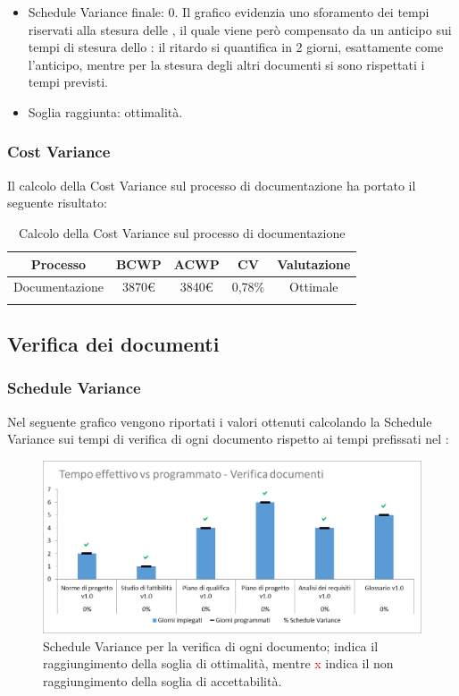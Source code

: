 \begin{itemize}
	\item Schedule Variance finale: 0. 
	Il grafico evidenzia uno sforamento dei tempi riservati alla stesura delle \NdP{}, il quale viene però compensato da un anticipo sui tempi di stesura dello \SdF{}: il ritardo si quantifica in 2 giorni, esattamente come l'anticipo, mentre per la stesura degli altri documenti si sono rispettati i tempi previsti. 
	
	\item Soglia raggiunta: ottimalità.
\end{itemize}

\subsubsection{Cost Variance}
Il calcolo della Cost Variance sul processo di documentazione ha portato il seguente risultato: 

{
\renewcommand{\arraystretch}{2}
\centering
\begin{longtable}{| c | c | c | c | c |}
	\hline
	\textbf{Processo} & \textbf{BCWP} & \textbf{ACWP} & \textbf{CV} & \textbf{Valutazione} \\
	\hline
	Documentazione & 3870\euro & 3840\euro & 0,78\% & Ottimale \\
	\hline
	\caption{Calcolo della Cost Variance sul processo di documentazione}
\end{longtable}

}


\subsection{Verifica dei documenti}
\subsubsection{Schedule Variance}
Nel seguente grafico vengono riportati i valori ottenuti calcolando la Schedule Variance sui tempi di verifica di ogni documento rispetto ai tempi prefissati nel \PdP{}:

\begin{figure}[h!]
	\centering
	\includegraphics[scale=0.75]{img/Grafici/SV-VerDocumenti.png}
	\caption{Schedule Variance per la verifica di ogni documento; \textcolor{green}{\checkmark} indica il raggiungimento della soglia di ottimalità, mentre \textcolor{red}{x} indica il non raggiungimento della soglia di accettabilità.}
	\label{fig:SV-VerDocumenti}
\end{figure}

